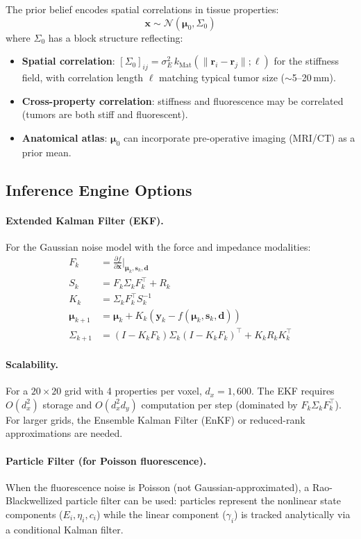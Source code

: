 \documentclass[11pt,a4paper]{article}
\theoremstyle{definition}
\begin{document}
The prior belief encodes spatial correlations in tissue properties:
\[
  \bm{x} \sim \mathcal{N}(\bm{\mu}_0, \Sigma_0)
\]
where $\Sigma_0$ has a block structure reflecting:
\begin{itemize}[nosep]
  \item \textbf{Spatial correlation}: $[\Sigma_0]_{ij} = \sigma_{E}^2 \, k_{\text{Mat}}(\|\bm{r}_i - \bm{r}_j\|; \ell)$ for the stiffness field, with correlation length $\ell$ matching typical tumor size ($\sim$5--20\,mm).
  \item \textbf{Cross-property correlation}: stiffness and fluorescence may be correlated (tumors are both stiff and fluorescent).
  \item \textbf{Anatomical atlas}: $\bm{\mu}_0$ can incorporate pre-operative imaging (MRI/CT) as a prior mean.
\end{itemize}

\subsection{Inference Engine Options}

\paragraph{Extended Kalman Filter (EKF).}
For the Gaussian noise model with the force and impedance modalities:
\begin{align}
  F_k &= \frac{\partial f}{\partial \bm{x}}\bigg|_{\bm{\mu}_k, \bm{s}_k, \bm{d}} \\
  S_k &= F_k \Sigma_k F_k^\top + R_k \\
  K_k &= \Sigma_k F_k^\top S_k^{-1} \\
  \bm{\mu}_{k+1} &= \bm{\mu}_k + K_k (\bm{y}_k - f(\bm{\mu}_k, \bm{s}_k, \bm{d})) \\
  \Sigma_{k+1} &= (I - K_k F_k) \Sigma_k (I - K_k F_k)^\top + K_k R_k K_k^\top
\end{align}

\paragraph{Scalability.}
For a $20 \times 20$ grid with 4 properties per voxel, $d_x = 1{,}600$.  The EKF requires $O(d_x^2)$ storage and $O(d_x^2 d_y)$ computation per step (dominated by $F_k \Sigma_k F_k^\top$).  For larger grids, the Ensemble Kalman Filter (EnKF) or reduced-rank approximations are needed.

\paragraph{Particle Filter (for Poisson fluorescence).}
When the fluorescence noise is Poisson (not Gaussian-approximated), a Rao-Blackwellized particle filter can be used: particles represent the nonlinear state components ($E_i, \eta_i, c_i$) while the linear component ($\gamma_i$) is tracked analytically via a conditional Kalman filter.
\end{document}
